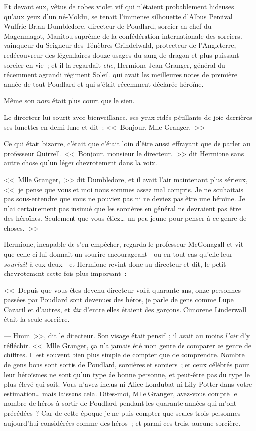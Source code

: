 Et devant eux, vêtus de robes violet vif qui n'étaient probablement hideuses qu'aux yeux d'un né-Moldu, se tenait l'immense silhouette d'Albus Percival Wulfric Brian Dumbledore, directeur de Poudlard, sorcier en chef du Magenmagot, Manitou suprême de la confédération internationale des sorciers, vainqueur du Seigneur des Ténèbres Grindelwald, protecteur de l'Angleterre, redécouvreur des légendaires douze usages du sang de dragon et plus puissant sorcier en vie~; et il la regardait \emph{elle}, Hermione Jean Granger, général du récemment agrandi régiment Soleil, qui avait les meilleures notes de première année de tout Poudlard et qui s'était récemment déclarée héroïne.

Même son \emph{nom} était plus court que le sien.

Le directeur lui sourit avec bienveillance, ses yeux ridés pétillants de joie derrières ses lunettes en demi-lune et dit~: <<~Bonjour, Mlle Granger.~>>

Ce qui était bizarre, c'était que c'était loin d'être aussi effrayant que de parler au professeur Quirrell. <<~Bonjour, monsieur le directeur,~>> dit Hermione sans autre chose qu'un léger chevrotement dans la voix.

<<~Mlle Granger,~>> dit Dumbledore, et il avait l'air maintenant plus sérieux, <<~je pense que vous et moi nous sommes assez mal compris. Je ne souhaitais pas sous-entendre que vous ne pouviez pas ni ne deviez pas être une héroïne. Je n'ai certainement pas insinué que les sorcières en général ne devraient pas être des héroïnes. Seulement que vous étiez… un peu jeune pour penser à ce genre de choses.~>>

Hermione, incapable de s'en empêcher, regarda le professeur McGonagall et vit que celle-ci lui donnait un sourire encourageant - ou en tout cas qu'elle leur \emph{souriait} à eux deux - et Hermione revint donc au directeur et dit, le petit chevrotement cette fois plus important~:

<<~Depuis que vous êtes devenu directeur voilà quarante ans, onze personnes passées par Poudlard sont devenues des héros, je parle de gens comme Lupe Cazaril et d'autres, et \emph{dix} d'entre elles étaient des garçons. Cimorene Linderwall était la seule sorcière.

--- Hmm~>>, dit le directeur. Son visage était pensif~; il avait au moins \emph{l'air} d'y réfléchir. <<~Mlle Granger, ça n'a jamais été mon genre de comparer ce genre de chiffres. Il est souvent bien plus simple de compter que de comprendre. Nombre de gens bons sont sortis de Poudlard, sorcières et sorciers~; et ceux célébrés pour leur héroïsmes ne sont qu'un type de bonne personne, et peut-être pas du type le plus élevé qui soit. Vous n'avez inclus ni Alice Londubat ni Lily Potter dans votre estimation… mais laissons cela. Dites-moi, Mlle Granger, avez-vous compté le nombre de héros à sortir de Poudlard pendant les quarante années qui m'ont précédées~? Car de cette époque je ne puis compter que seules trois personnes aujourd'hui considérées comme des héros~; et parmi ces trois, aucune sorcière.

